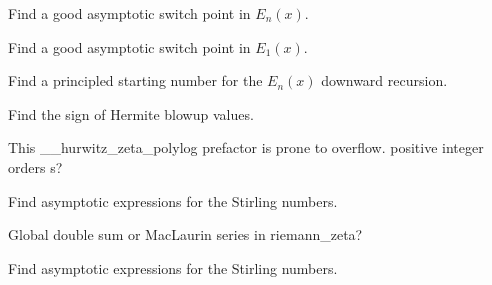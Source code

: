 \begin{DoxyRefList}
Find a good asymptotic switch point in $ E_n(x) $.  
\item[\label{todo__todo000006}%
\Hypertarget{todo__todo000006}%
Member \hyperlink{namespacestd_1_1____detail_a665eb0c524b929c035d88bbb17815917}{std\+:\+:\+\_\+\+\_\+detail\+:\+:\+\_\+\+\_\+expint\+\_\+\+E1} (\+\_\+\+Tp \+\_\+\+\_\+x)]Find a good asymptotic switch point in $ E_1(x) $.  
\item[\label{todo__todo000005}%
\Hypertarget{todo__todo000005}%
Member \hyperlink{namespacestd_1_1____detail_a9b0a2050324390fb6c4a584170289a99}{std\+:\+:\+\_\+\+\_\+detail\+:\+:\+\_\+\+\_\+expint\+\_\+\+En\+\_\+recursion} (unsigned int \+\_\+\+\_\+n, \+\_\+\+Tp \+\_\+\+\_\+x)]Find a principled starting number for the $ E_n(x) $ downward recursion.  
\item[\label{todo__todo000009}%
\Hypertarget{todo__todo000009}%
Member \hyperlink{namespacestd_1_1____detail_addad9d3f5ca8a7ddae63c9e7c5374e70}{std\+:\+:\+\_\+\+\_\+detail\+:\+:\+\_\+\+\_\+hermite\+\_\+recur} (unsigned int \+\_\+\+\_\+n, \+\_\+\+Tp \+\_\+\+\_\+x)]Find the sign of Hermite blowup values.  
\item[\label{todo__todo000010}%
\Hypertarget{todo__todo000010}%
Member \hyperlink{namespacestd_1_1____detail_a7c45415c3ec0e137eea2364a6dd3af4e}{std\+:\+:\+\_\+\+\_\+detail\+:\+:\+\_\+\+\_\+hurwitz\+\_\+zeta\+\_\+polylog} (\+\_\+\+Tp \+\_\+\+\_\+s, std\+::complex$<$ \+\_\+\+Tp $>$ \+\_\+\+\_\+a)]This \+\_\+\+\_\+hurwitz\+\_\+zeta\+\_\+polylog prefactor is prone to overflow. positive integer orders s?  
\item[\label{todo__todo000014}%
\Hypertarget{todo__todo000014}%
Member \hyperlink{namespacestd_1_1____detail_a7ba1fde0547236676d579b6405f2fb25}{std\+:\+:\+\_\+\+\_\+detail\+:\+:\+\_\+\+\_\+log\+\_\+stirling\+\_\+2} (unsigned int \+\_\+\+\_\+n, unsigned int \+\_\+\+\_\+m)]Find asymptotic expressions for the Stirling numbers.  
\item[\label{todo__todo000017}%
\Hypertarget{todo__todo000017}%
Member \hyperlink{namespacestd_1_1____detail_a2be77d9bdd1b8b463be44a0e7558bc2a}{std\+:\+:\+\_\+\+\_\+detail\+:\+:\+\_\+\+\_\+riemann\+\_\+zeta} (\+\_\+\+Tp \+\_\+\+\_\+s)]Global double sum or Mac\+Laurin series in riemann\+\_\+zeta?  
\item[\label{todo__todo000015}%
\Hypertarget{todo__todo000015}%
Member \hyperlink{namespacestd_1_1____detail_a8b215e4ca28ec9b7b078d7f3d9aecc17}{std\+:\+:\+\_\+\+\_\+detail\+:\+:\+\_\+\+\_\+stirling\+\_\+1} (unsigned int \+\_\+\+\_\+n, unsigned int \+\_\+\+\_\+m)]Find asymptotic expressions for the Stirling numbers.  

\end{DoxyRefList}
